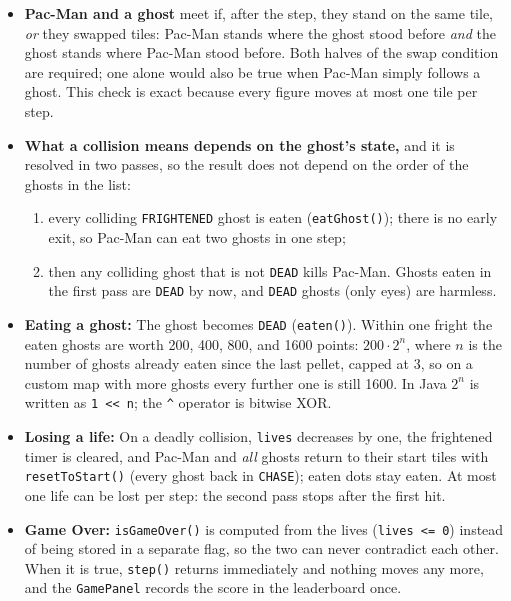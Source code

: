 \documentclass[11pt, a4paper]{article}
\begin{document}
\begin{itemize}
    The duration never reaches 0: a 0-step fright would turn the ghosts white and around, and the countdown could leave them frightened forever. A new pellet restarts the full duration.
    \item \textbf{Pac-Man and a ghost} meet if, after the step, they stand on the same tile, \textit{or} they swapped tiles: Pac-Man stands where the ghost stood before \textit{and} the ghost stands where Pac-Man stood before. Both halves of the swap condition are required; one alone would also be true when Pac-Man simply follows a ghost. This check is exact because every figure moves at most one tile per step.
    \item \textbf{What a collision means depends on the ghost's state,} and it is resolved in two passes, so the result does not depend on the order of the ghosts in the list:
    \begin{enumerate}
        \item every colliding \texttt{FRIGHTENED} ghost is eaten (\texttt{eatGhost()}); there is no early exit, so Pac-Man can eat two ghosts in one step;
        \item then any colliding ghost that is not \texttt{DEAD} kills Pac-Man. Ghosts eaten in the first pass are \texttt{DEAD} by now, and \texttt{DEAD} ghosts (only eyes) are harmless.
    \end{enumerate}
    \item \textbf{Eating a ghost:} The ghost becomes \texttt{DEAD} (\texttt{eaten()}). Within one fright the eaten ghosts are worth 200, 400, 800, and 1600 points: $200 \cdot 2^n$, where $n$ is the number of ghosts already eaten since the last pellet, capped at 3, so on a custom map with more ghosts every further one is still 1600. In Java $2^n$ is written as \texttt{1 << n}; the \texttt{\^{}} operator is bitwise XOR.
    \item \textbf{Losing a life:} On a deadly collision, \texttt{lives} decreases by one, the frightened timer is cleared, and Pac-Man and \textit{all} ghosts return to their start tiles with \texttt{resetToStart()} (every ghost back in \texttt{CHASE}); eaten dots stay eaten. At most one life can be lost per step: the second pass stops after the first hit.
    \item \textbf{Game Over:} \texttt{isGameOver()} is computed from the lives (\texttt{lives <= 0}) instead of being stored in a separate flag, so the two can never contradict each other. When it is true, \texttt{step()} returns immediately and nothing moves any more, and the \texttt{GamePanel} records the score in the leaderboard once.
\end{itemize}
\end{document}
